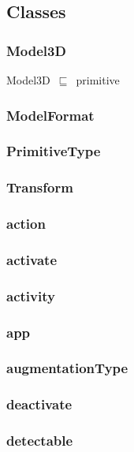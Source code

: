 \documentclass{article}
\begin{document}
\subsection*{Classes}

\subsubsection*{Model3D}

Model3D~\ensuremath{\sqsubseteq}~primitive~

\subsubsection*{ModelFormat}

\subsubsection*{PrimitiveType}

\subsubsection*{Transform}

\subsubsection*{action}

\subsubsection*{activate}

\subsubsection*{activity}

\subsubsection*{app}

\subsubsection*{augmentationType}

\subsubsection*{deactivate}

\subsubsection*{detectable}
\end{document}
